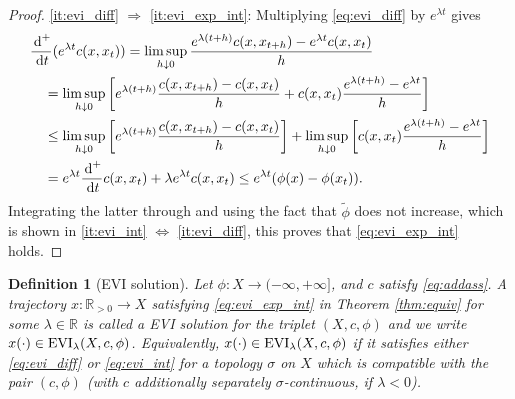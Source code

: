 \documentclass[reqno]{amsart}
\newcounter{results}[section]
\theoremstyle{plain}
\theoremstyle{remark}
\theoremstyle{plain}
\newtheorem{definition}[results]{Definition}
\numberwithin{equation}{section}
\theoremstyle{remark}
\newcommand{\R}{\mathbb{R}}
\newcommand{\de}{{\,\rm d}}
\DeclareMathOperator{\EVI}{{\rm EVI}}
\begin{document}
\begin{proof}
 \ref{it:evi_diff} $\Rightarrow$ \ref{it:evi_exp_int}:  Multiplying \eqref{eq:evi_diff} by $e^{\lambda t}$ gives
\begin{align*}
     &\frac{\de^+}{\de t}(e^{\lambda t} c(x,x_t)) = \limsup_{h \downarrow 0 } \frac{e^{\lambda(t+h)}c(x,x_{t+h})-e^{\lambda t} c(x, x_t)}{h} \\
    &\quad= \limsup_{h \downarrow 0 } \left [e^{\lambda(t+h)} \frac{c(x,x_{t+h})-c(x,x_t)}{h} + c(x,x_t) \frac{e^{\lambda(t+h)}-e^{\lambda t}}{h} \right ] \\
& \quad\le \limsup_{h \downarrow 0 } \left [e^{\lambda(t+h)} \frac{c(x,x_{t+h})-c(x,x_t)}{h} \right ] + \limsup_{h \downarrow 0} \left [ c(x,x_t) \frac{e^{\lambda(t+h)}-e^{\lambda t}}{h} \right ] \\
& \quad= e^{\lambda t} \frac{\de^+}{\de t} c(x,x_t) + \lambda e^{\lambda t} c(x,x_t) \le e^{\lambda t} (\phi(x)-\phi(x_t)).
\end{align*}
Integrating the latter through \cite[Lemma A.1]{MuratoriSavare} and  using the fact that $\tilde \phi$  does not increase,  which is  shown in \ref{it:evi_int} $\Leftrightarrow$ \ref{it:evi_diff},  this  proves  that \eqref{eq:evi_exp_int} holds. 
\end{proof}














\begin{definition}[EVI solution]
\label{def:evisolution}  Let $\phi:X\to (-\infty, + \infty]$,  and   $c$  satisfy  \eqref{eq:addass}. A trajectory  $x:\R_{>0} \to X$ satisfying \eqref{eq:evi_exp_int} in  Theorem \ref{thm:equiv} for some $\lambda \in \R$ is called  a \emph{EVI solution} for the triplet $(X,c, \phi)$  and we  write $x(\cdot) \in \EVI_\lambda(X,c, \phi)$.  Equivalently, $x(\cdot) \in \EVI_\lambda(X,c, \phi)$ if it satisfies either \eqref{eq:evi_diff} or \eqref{eq:evi_int} for a topology $\sigma$ on $X$ which is compatible with the pair $(c, \phi)$ (with $c$ additionally separately $\sigma$-continuous, if $\lambda<0$). 
\end{definition}
\end{document}
